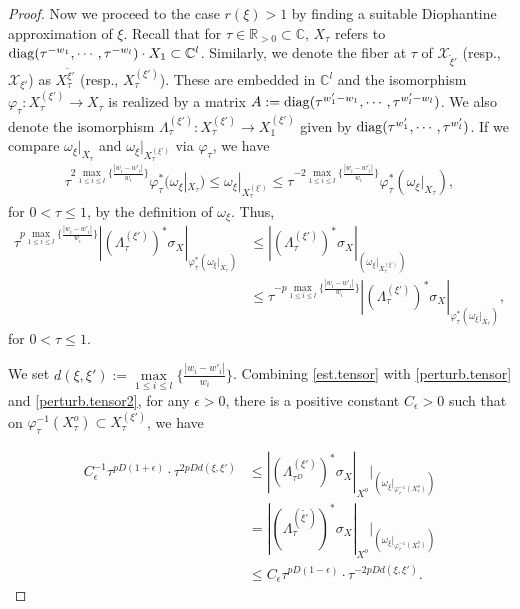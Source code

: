 \documentclass[12pt,a4paper]{amsart}
\theoremstyle{remark}
\theoremstyle{definition}
\def\R{\mathbb{R}}
\def\C{\mathbb{C}}
\def\X{\mathcal{X}}
\begin{document}
\begin{proof}
Now we proceed to the case $r(\xi)>1$ by finding a suitable 
Diophantine approximation of $\xi$. 
Recall that 
for 
$\tau\in \R_{>0}\subset \C$, $X_\tau$ refers to 
${\rm diag}(\tau^{-w_1},\cdots,\tau^{-w_l})\cdot X_1\subset \C^l$. 
Similarly, we denote the fiber at $\tau$ of 
$\X_{\tilde{\xi}'}$ (resp., $\X_{\xi'}$) 
as $X_{\tau}^{\tilde{\xi}'}$ (resp., $X_\tau^{(\xi')}$). 
These are embedded in $\C^l$ and the isomorphism 
$\varphi_\tau\colon 
X_\tau^{(\xi')}\to X_\tau$ is realized by 
a matrix 
$A:={\rm diag}(\tau^{w'_1-w_1},\cdots,\tau^{w'_l-w_l})$. 
We also denote the isomorphism 
$\Lambda_{\tau}^{(\xi')}\colon 
X_\tau^{(\xi')}\to X_1^{(\xi')}$ given by 
${\rm diag}(\tau^{w'_1},\cdots,\tau^{w'_l})$. 
If we compare $\omega_\xi|_{X_{\tau}}$ and $\omega_{\xi}|_{X_\tau^{(\xi')}}$ via $\varphi_\tau$, 
we have 
\begin{align}\label{ggcomp}
\tau^{2\underset{1\le i\le l}\max\bigl\{\frac{|w_i-w'_i|}{w_i}\bigr\}}
\varphi_\tau^* (
\omega_\xi|_{X_\tau})
\le 
\omega_\xi|_{X_\tau^{(\xi')}} 
\le 
\tau^{-2\underset{1\le i\le l}\max\bigl\{\frac{|w_i-w'_i|}{w_i}\bigr\}}
\varphi_\tau^* (
\omega_\xi|_{X_\tau}), 
\end{align}
for $0<\tau\le 1$, 
by the definition of $\omega_\xi$. Thus, 
\begin{align}\label{perturb.tensor}
\tau^{p\underset{1\le i\le l}\max\bigl\{\frac{|w_i-w'_i|}{w_i}\bigr\}}
|(\Lambda_\tau^{(\xi')})^*\sigma_X|_{\varphi_\tau^*(\omega_\xi|_{X_\tau})}
&\le 
|(\Lambda_\tau^{(\xi')})^*\sigma_X|
_{(\omega_\xi|_{X_\tau^{(\xi')}})}\\
&\le  \label{perturb.tensor2}
\tau^{-p\underset{1\le i\le l}\max\bigl\{\frac{|w_i-w'_i|}{w_i}\bigr\}}
|(\Lambda_\tau^{(\xi')})^*\sigma_X|_{\varphi_\tau^*(\omega_\xi|_{X_\tau})}, 
\end{align}
for $0<\tau\le 1$. 

We set $d(\xi,\xi'):=\underset{1\le i\le l}\max\bigl\{\frac{|w_i-w'_i|}{w_i}\bigr\}$. 
Combining \eqref{est.tensor} with \eqref{perturb.tensor} and 
\eqref{perturb.tensor2}, 
for any $\epsilon>0$, there is a positive constant 
$C_{\epsilon}>0$ such that on 
$\varphi_\tau^{-1}(X_\tau^o)\subset X_\tau^{(\xi')}$, we have 

\begin{align}\label{tensor1}
C_{\epsilon}^{-1}\tau^{pD(1+\epsilon)}\cdot \tau^{2pD d(\xi,\xi')}
& \le 
|(\Lambda_{\tau^D}^{(\xi')})^* \sigma_X|_{X^o}|_{(\omega_\xi|_{\varphi_\tau^{-1}(X_\tau^o)})}\\ 
&\label{tensor2}
=|(\Lambda_{\tau}^{(\tilde{\xi'})})^* \sigma_X|_{X^o}|_{(\omega_\xi|_{\varphi_\tau^{-1}(X_\tau^o)})}\\ 
&\label{tensor3}
\le C_{\epsilon}\tau^{pD(1-\epsilon)}\cdot \tau^{-2pD d(\xi,\xi')}. 
\end{align}


\end{proof}
\end{document}
